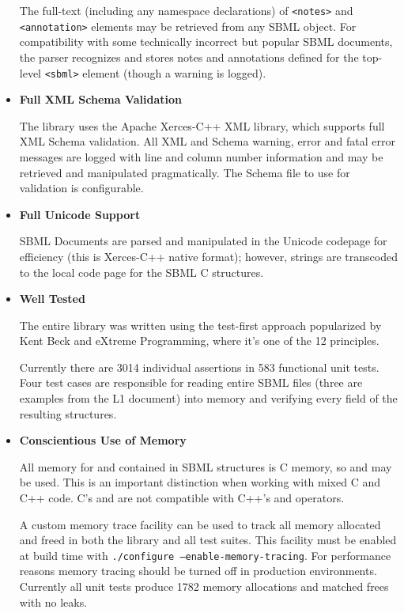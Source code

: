 \documentclass{sbmlmanual}
\begin{document}
\begin{itemize}
  The full-text (including any namespace declarations) of
  \texttt{<notes>} and \texttt{<annotation>} elements may be retrieved
  from any SBML object.  For compatibility with some technically
  incorrect but popular SBML documents, the parser recognizes and
  stores notes and annotations defined for the top-level
  \texttt{<sbml>} element (though a warning is logged).

  \item \textbf{Full XML Schema Validation}

  The library uses the Apache Xerces-C++ XML library, which supports
  full XML Schema validation.  All XML and Schema warning, error and
  fatal error messages are logged with line and column number
  information and may be retrieved and manipulated pragmatically.  The
  Schema file to use for validation is configurable.

  \item \textbf{Full Unicode Support}

  SBML Documents are parsed and manipulated in the Unicode codepage
  for efficiency (this is Xerces-C++ native format); however, strings
  are transcoded to the local code page for the SBML C structures.

  \item \textbf{Well Tested}

  The entire library was written using the test-first approach
  popularized by Kent Beck and eXtreme Programming, where it's one of
  the 12 principles.

  Currently there are 3014 individual assertions in 583 functional
  unit tests.  Four test cases are responsible for reading entire SBML
  files (three are examples from the L1 document) into memory and
  verifying every field of the resulting structures.

  \item \textbf{Conscientious Use of Memory}

  All memory for and contained in SBML structures is C memory, so
   and  may be used.  This is an
  important distinction when working with mixed C and C++ code.  C's
   and  are not compatible with C++'s
   and  operators.

  A custom memory trace facility can be used to track all memory
  allocated and freed in both the library and all test suites.  This
  facility must be enabled at build time with \texttt{./configure
  --enable-memory-tracing}.  For performance reasons memory tracing
  should be turned off in production environments.  Currently all unit
  tests produce 1782 memory allocations and matched frees with no
  leaks.

\end{itemize}
\end{document}
